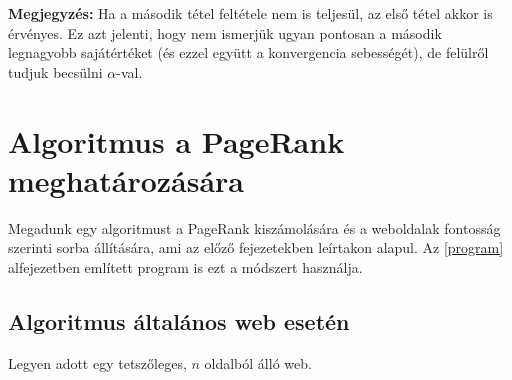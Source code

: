 \documentclass[12pt,a4paper]{article}
\begin{document}
\textbf{Megjegyzés:} Ha a második tétel feltétele nem is teljesül, az első tétel akkor is érvényes. Ez azt jelenti, hogy nem ismerjük ugyan pontosan a második legnagyobb sajátértéket (és ezzel együtt a konvergencia sebességét), de felülről tudjuk becsülni $\alpha$-val.

\section{Algoritmus a PageRank meghatározására}

Megadunk egy algoritmust a PageRank kiszámolására és a weboldalak fontosság szerinti sorba állítására, ami az előző fejezetekben leírtakon alapul. Az \ref{program} alfejezetben említett program is ezt a módszert használja.

\subsection{Algoritmus általános web esetén}

Legyen adott egy tetszőleges, $n$ oldalból álló web.
\end{document}
